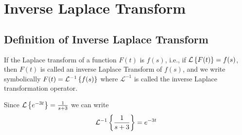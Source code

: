 \documentclass[../main-sheet.tex]{subfiles}
\begin{document}
\chapter{Inverse Laplace Transform}
\section{Definition of Inverse Laplace Transform}
If the Laplace transform of a function $ F(t) $ is $ f(s) $, i.e., if $ \mathcal{L}\left\{ F(t)\right\}=f(s) $, then $ F(t) $ is called an inverse Laplace Transform of $ f(s) $, and we write symbolically $ F(t)=\mathcal{L}^{-1}\left\{ f(s)\right\} $ where $ \mathcal{L}^{-1} $ is called the inverse Laplace transformation operator.
\begin{ex}
    Since $ \mathcal{L}\left\{ e^{-3t}\right\}=\frac{1}{s+3} $ we can write
    \[
        \mathcal{L}^{-1}\left\{ \frac{1}{s+3}\right\}=e^{-3t}
    \]
\end{ex}
\end{document}
